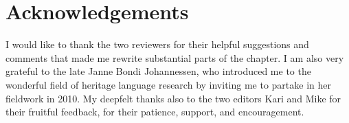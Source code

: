 \documentclass[output=paper]{langscibook}
\begin{document}
\section*{Acknowledgements}

I would like to thank the two reviewers for their helpful suggestions and comments that made me rewrite substantial parts of the chapter. I am also very grateful to the late Janne Bondi Johannessen, who introduced me to the wonderful field of heritage language research by inviting me to partake in her fieldwork in 2010. My deepfelt thanks also to the two editors Kari and Mike for their fruitful feedback, for their patience, support, and encouragement.

\printbibliography[heading=subbibliography,notkeyword=this]
\end{document}
